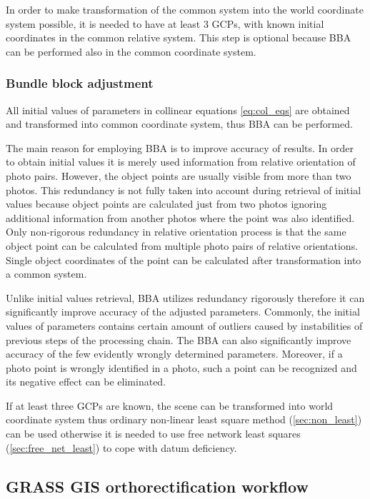 \documentclass[a4paper,12pt]{article}
\begin{document}
In order to make transformation of the common system into the world coordinate system possible, it is needed 
to have at least 3 GCPs, with known initial coordinates in the common relative system. 
This step is optional because  BBA can be performed also in the common coordinate system. 

\subsubsection{Bundle block adjustment}

All initial values of parameters in collinear equations \eqref{eq:col_eqs} are obtained and transformed into common coordinate system, thus 
BBA can be performed.

The main reason for employing BBA is to improve accuracy of results.
In order to obtain initial values it is merely used information from relative orientation of photo pairs.
However, the object points are usually visible from more than two photos. This redundancy is not fully taken 
into account during retrieval of initial values because object points are calculated just from two photos
ignoring additional information from another photos where the point was also identified.
Only non-rigorous redundancy  in relative orientation process is that the same object point can 
be calculated from multiple photo pairs of relative orientations.
Single object coordinates of the point can be calculated after transformation into a common system.  


Unlike initial values retrieval, BBA utilizes redundancy rigorously therefore 
it can significantly improve accuracy of the adjusted parameters.
Commonly, the initial values of parameters contains certain amount of outliers caused by instabilities of previous steps of the processing chain.
The BBA can also significantly improve accuracy of the few evidently wrongly determined parameters.
Moreover, if a photo point is wrongly identified in a photo, such a point can be recognized and its 
negative effect can be eliminated.

If at least three GCPs are known, the scene can be transformed into world coordinate system thus ordinary non-linear least square method (\ref{sec:non_least}) 
can be used otherwise
it is needed to use free network least squares (\ref{sec:free_net_least}) to cope with datum deficiency. 

\subsection{GRASS GIS orthorectification workflow}
\end{document}
